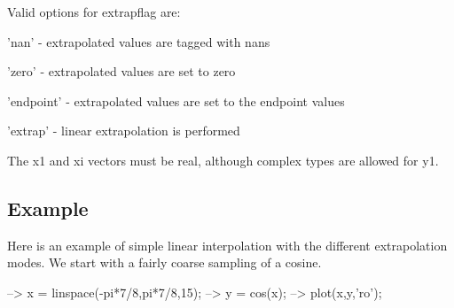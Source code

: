 Valid options for {\ttfamily extrapflag} are\-: 
\begin{DoxyItemize}
\item {\ttfamily 'nan'} -\/ extrapolated values are tagged with {\ttfamily nan}s  
\item {\ttfamily 'zero'} -\/ extrapolated values are set to zero  
\item {\ttfamily 'endpoint'} -\/ extrapolated values are set to the endpoint values  
\item {\ttfamily 'extrap'} -\/ linear extrapolation is performed  
\end{DoxyItemize}The {\ttfamily x1} and {\ttfamily xi} vectors must be real, although complex types are allowed for {\ttfamily y1}. \hypertarget{variables_struct_Example}{}\subsection{Example}\label{variables_struct_Example}
Here is an example of simple linear interpolation with the different extrapolation modes. We start with a fairly coarse sampling of a cosine.


\begin{DoxyVerbInclude}
--> x = linspace(-pi*7/8,pi*7/8,15);
--> y = cos(x);
--> plot(x,y,'ro');
\end{DoxyVerbInclude}


